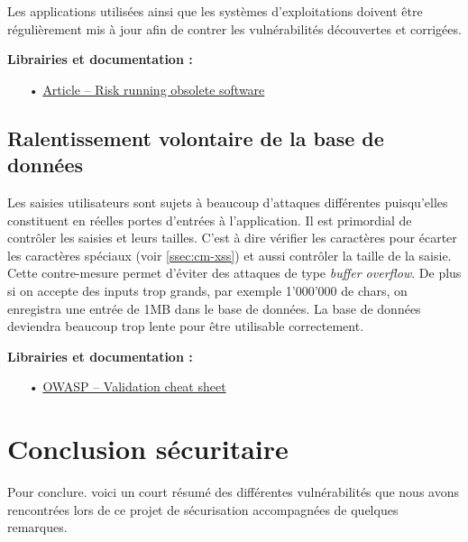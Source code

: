 \documentclass[12pt]{article}
\begin{document}
Les applications utilisées ainsi que les systèmes d'exploitations doivent être régulièrement mis à jour afin de contrer les vulnérabilités découvertes et corrigées.

\medskip
\textbf{Librairies et documentation :}

\begin{itemize}
\item[•] \href{http://techgenix.com/risk-running-obsolete-software-part1/}{Article -- Risk running obsolete software}
\end{itemize}

\subsection{Ralentissement volontaire de la base de données}
\label{ssec:cm-oversizing}

Les saisies utilisateurs sont sujets à beaucoup d'attaques différentes puisqu'elles constituent en réelles portes d'entrées à l'application. Il est primordial de contrôler les saisies et leurs tailles. C'est à dire vérifier les caractères pour écarter les caractères spéciaux (voir \autoref{ssec:cm-xss}) et aussi contrôler la taille de la saisie. Cette contre-mesure permet d'éviter des attaques de type \emph{buffer overflow}. De plus si on accepte des inputs trop grands, par exemple  1'000'000 de chars, on enregistra une entrée de 1MB dans le base de données. La base de données deviendra beaucoup trop lente pour être utilisable correctement.

\medskip
\textbf{Librairies et documentation :}

\begin{itemize}
\item[•] \href{https://www.owasp.org/index.php/Input_Validation_Cheat_Sheet}{OWASP -- Validation cheat sheet}
\end{itemize}

\clearpage
\section{Conclusion sécuritaire}
\label{sec:conclusion}

Pour conclure. voici un court résumé des différentes vulnérabilités que nous avons rencontrées lors de ce projet de sécurisation accompagnées de quelques remarques.
\vspace{5mm}
\end{document}
